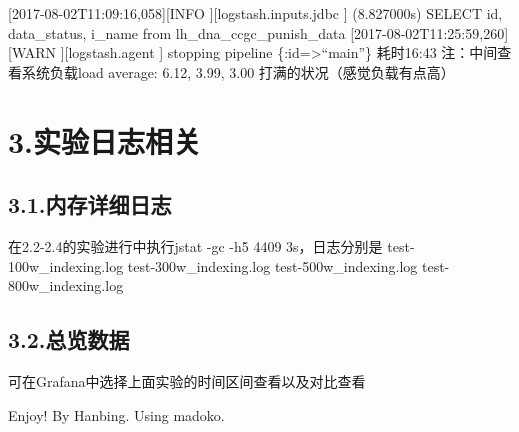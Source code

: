\documentclass{article}
\begin{document}
[2017-08-02T11:09:16,058][INFO ][logstash.inputs.jdbc     ] (8.827000s) SELECT id, data\_status, i\_name from lh\_dna\_ccgc\_punish\_data             \mdbr
{}[2017-08-02T11:25:59,260][WARN ][logstash.agent           ] stopping pipeline \{:id=\textgreater{}\textquotedblleft{}main\textquotedblright{}\}             \mdbr
{}耗时16:43          \mdbr
{}注：中间查看系统负载load average: 6.12, 3.99, 3.00 打满的状况（感觉负载有点高）              %

\section{3.\hspace*{0.5em}实验日志相关}\label{section}%

\subsection{3.1.\hspace*{0.5em}内存详细日志}\label{section}%

\noindent{}在2.2-2.4的实验进行中执行jstat -gc -h5 4409 3s，日志分别是     \mdbr
{}test-100w\_indexing.log     \mdbr
{}test-300w\_indexing.log     \mdbr
{}test-500w\_indexing.log     \mdbr
{}test-800w\_indexing.log      %

\subsection{3.2.\hspace*{0.5em}总览数据}\label{section}%

\noindent{}可在Grafana中选择上面实验的时间区间查看以及对比查看      %

\noindent{}Enjoy! By Hanbing.    \mdbr
{}Using madoko.%
\end{document}
